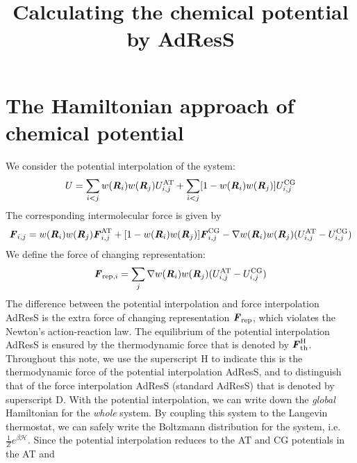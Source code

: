 \documentclass[aip,jcp,a4paper,reprint,onecolumn]{revtex4-1}
\newcommand{\vect}[1]{\textbf{\textit{#1}}}
\newcommand{\AT}{{\textrm{{AT}}}}
\newcommand{\CG}{{\textrm{CG}}}
\newcommand{\thf}{{\textrm{th}}}
\newcommand{\res}{{\textrm{rep}}}
\newcommand{\hadress}{{\textrm{H}}}
\newcommand{\mh}{\mathcal H}
\begin{document}
\title{Calculating the chemical potential by AdResS}

\begin{abstract}
\end{abstract}

\maketitle

\section{The Hamiltonian approach of chemical potential}
We consider the potential interpolation of the
system:
\begin{align}
  U =
  \sum_{i<j} w(\vect R_i) w(\vect R_j)
  U^\AT_{i,j}
  +
  \sum_{i<j}[1- w(\vect R_i) w(\vect R_j)]
  U^\CG_{i,j}
\end{align}
The corresponding intermolecular force is given by
\begin{align}\label{eqn:interpol-f}
  \vect F_{i,j} =
  w(\vect R_i) w(\vect R_j)
  \vect F^\AT_{i,j}
  +
  [1- w(\vect R_i) w(\vect R_j)]
  \vect F_{i,j}^\CG
  -
  \nabla w(\vect R_i) w(\vect R_j)
  (U^\AT_{i,j} - U^\CG_{i,j})
\end{align}
We define the force of changing representation:
\begin{align}
  \vect F_{\res,i} = 
  \sum_j \nabla w(\vect R_i) w(\vect R_j)
  (U^\AT_{i,j} - U^\CG_{i,j})
\end{align}
The difference between the potential interpolation and force
interpolation AdResS is the extra force of
changing representation $\vect F_\res$,
which violates the Newton's
action-reaction law.
The equilibrium of the potential interpolation AdResS
is ensured by the thermodynamic force that is denoted
by $\vect F_\thf^\hadress$.
Throughout this note,
we use the superscript H to indicate this is the thermodynamic force of the
potential interpolation  AdResS, and to distinguish that
of the force interpolation AdResS (standard AdResS)
that is denoted by superscript D.
With the potential interpolation, we can write down
the \emph{global} Hamiltonian for the \emph{whole} system.
By coupling this system
to the Langevin thermostat, we can safely write the Boltzmann
distribution for the system, i.e.  $\frac 1Ze^{\beta\mh}$.  Since the
potential interpolation reduces to the AT and CG potentials in the AT and
\end{document}
